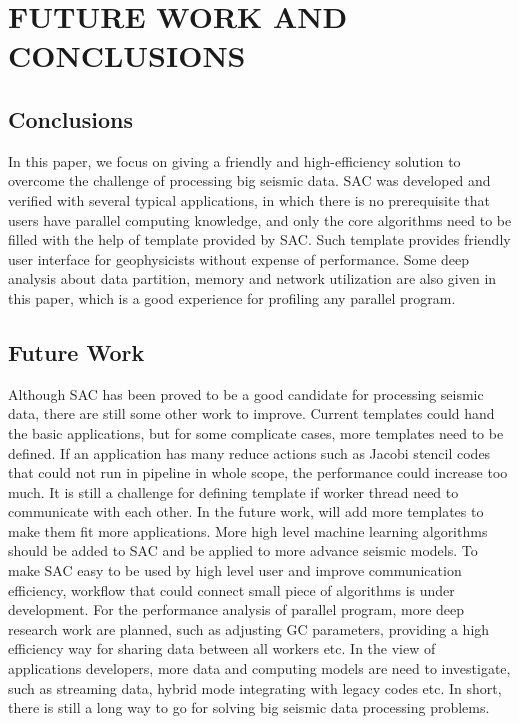 %
%
%



\chapter{\uppercase{Future Work and Conclusions}}

\section{Conclusions}

In this paper, we focus on giving a friendly and high-efficiency solution to overcome the challenge of processing big seismic data. SAC was developed and verified with several typical applications, in which there is no prerequisite that users have parallel computing knowledge, and only the core algorithms need to be filled with the help of template provided by SAC. Such template provides friendly user interface for geophysicists without expense of performance. Some deep analysis about data partition, memory and network utilization are also given in this paper, which is a good experience for profiling any parallel program. 

\section{Future Work}

Although SAC has been proved to be a good candidate for processing seismic data, there are still some other work to improve. Current templates could hand the basic applications, but for some complicate cases, more templates need to be defined. If an application has many reduce actions such as Jacobi stencil codes that could not run in pipeline in whole scope, the performance could increase too much. It is still a challenge for defining template if worker thread need to communicate with each other. In the future work, will add more templates to make them fit more applications. More high level machine learning algorithms should be added to SAC and be applied to more advance seismic models. To make SAC easy to be used by high level user and improve communication efficiency, workflow that could connect small piece of algorithms is under development. For the performance analysis of parallel program, more deep research work are planned, such as adjusting GC parameters, providing a high efficiency way for sharing data between all workers etc. In the view of applications developers, more data and computing models are need to investigate, such as streaming data, hybrid mode integrating with legacy codes etc. In short, there is still a long way to go for solving big seismic data processing problems.   

